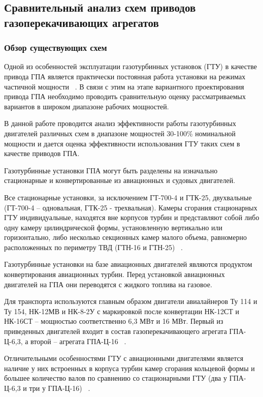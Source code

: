 \subsection{Сравнительный анализ схем приводов газоперекачивающих агрегатов}

\subsubsection{Обзор существующих схем}
Одной из особенностей эксплуатации газотурбинных установок (ГТУ) в качестве привода ГПА является практически постоянная
работа установки на режимах частичной мощности ~\cite{gtd_oil_and_gas}. В связи с этим на этапе вариантного проектирования
привода ГПА необходимо проводить сравнительную оценку рассматриваемых вариантов в широком диапазоне рабочих мощностей.

В данной работе проводится анализ эффективности работы газотурбинных двигателей различных схем в диапазоне мощностей
30-100\% номинальной мощности и дается оценка эффективности использования ГТУ таких схем в качестве приводов ГПА.

Газотурбинные установки ГПА могут быть разделены на изначально стационарные и конвертированные из авиационных и судовых двигателей.

Все стационарные установки, за исключением ГТ-700-4 и ГТК-25, двухвальные (ГТ-700-4 – одновальная, ГТК-25 - трехвальная).
Камеры сгорания стационарных ГТУ индивидуальные, находятся вне корпусов турбин и представляют собой либо одну камеру
цилиндрической формы, установленную вертикально или горизонтально, либо несколько секционных камер малого объема,
равномерно расположенных по периметру ТВД (ГТН-16 и ГТН-25) ~\cite{gtd_tomsk}.

Газотурбинные установки на базе авиационных двигателей являются продуктом конвертирования авиационных турбин. Перед
установкой авиационных двигателей на ГПА они переводятся с жидкого топлива на газовое.

Для транспорта используются главным образом двигатели авиалайнеров Ту 114 и Ту 154, НК-12МВ и НК-8-2У с маркировкой
после конвертации НК-12СТ и НК-16СТ – мощностью соответственно 6,3 МВт и 16 МВт. Первый из приведенных двигателей входит
в состав газоперекачивающего агрегата ГПА-Ц-6,3, а второй – агрегата ГПА-Ц-16 ~\cite{gtd_tomsk}.

Отличительными особенностями ГТУ с авиационными двигателями является наличие у них встроенных в корпуса турбин камер
сгорания кольцевой формы и большее количество валов по сравнению со стационарными ГТУ (два у ГПА-Ц-6,3 и три у ГПА-Ц-16) ~\cite{gtd_tomsk}.

